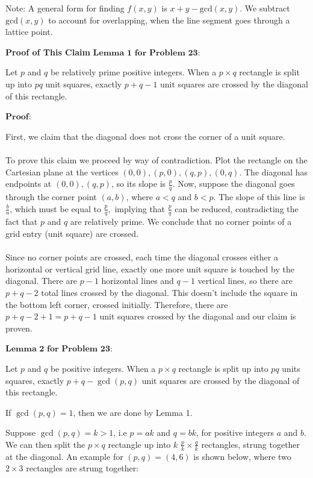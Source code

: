 \begin{enumerate}
 Note: A general form for finding $f(x, y)$ is $x+y-\text{gcd}(x, y).$ We subtract $\text{gcd}(x, y)$ to account for overlapping, when the line segment goes through a lattice point.

 \textbf{Proof of This Claim} $\textbf{Lemma 1 for Problem 23:}$

 Let $p$ and $q$ be relatively prime positive integers. When a $p\times q$ rectangle is split up into $pq$ unit squares, exactly $p + q - 1$ unit squares are crossed by the diagonal of this rectangle. 

 
$\textbf{Proof:}$

 
First, we claim that the diagonal does not cross the corner of a unit square. \\\\To prove this claim we proceed by way of contradiction. Plot the rectangle on the Cartesian plane at the vertices $(0,0),(p,0),(q,p),(0,q).$ The diagonal has endpoints at $(0,0),(q,p)$, so its slope is $\frac{p}{q}.$  Now, suppose the diagonal goes through the corner point $(a,b)$, where $a<q$ and $b<p$. The slope of this line is $\frac{b}{a}$, which must be equal to $\frac{p}{q},$ implying that $\frac{p}{q}$ can be reduced, contradicting the fact that $p$ and $q$ are relatively prime. We conclude that no corner points of a grid entry (unit square) are crossed. \\\\Since no corner points are crossed, each time the diagonal crosses either a horizontal or vertical grid line, exactly one more unit square is touched by the diagonal. There are $p-1$ horizontal lines and $q-1$ vertical lines, so there are $p + q - 2$ total lines crossed by the diagonal. This doesn't include the square in the bottom left corner, crossed initially. Therefore, there are $p + q-2 + 1 = p + q - 1$ unit squares crossed by the diagonal and our claim is proven.

 $\textbf{Lemma 2 for Problem 23:}$

 
Let $p$ and $q$ be positive integers. When a $p\times q$ rectangle is split up into $pq$ units squares, exactly $p + q - \gcd(p, q)$ unit squares are crossed by the diagonal of this rectangle.

 
If $\gcd (p,q) = 1$, then we are done by Lemma 1.

 Suppose $\gcd(p,q) = k>1$, i.e $p = ak$ and $q = bk$, for positive integers $a$ and $b$. We can then split the $p\times q$ rectangle up into $k$ $\frac{p}{k} \times \frac{q}{k}$ rectangles, strung together at the diagonal. An example for $(p,q)=(4,6)$ is shown below, where two $2\times 3$ rectangles are strung together: 


\end{enumerate}
